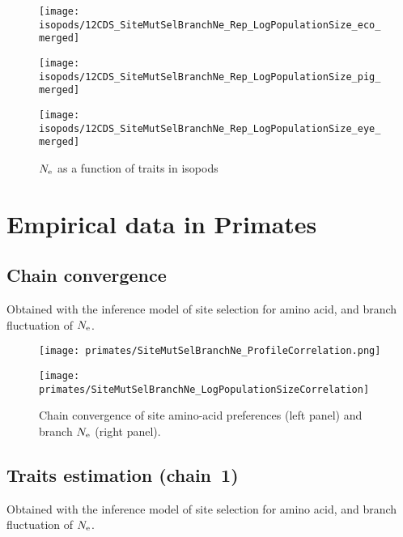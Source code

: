 \begin{figure}[H]
    \centering
    \begin{minipage}{0.32\linewidth}
        \texttt{[image: isopods/12CDS\_SiteMutSelBranchNe\_Rep\_LogPopulationSize\_eco\_merged]}
    \end{minipage} \hfill
    \begin{minipage}{0.32\linewidth}
        \texttt{[image: isopods/12CDS\_SiteMutSelBranchNe\_Rep\_LogPopulationSize\_pig\_merged]}
    \end{minipage} \hfill
    \begin{minipage}{0.32\linewidth}
        \texttt{[image: isopods/12CDS\_SiteMutSelBranchNe\_Rep\_LogPopulationSize\_eye\_merged]}
    \end{minipage}
    \caption[$\Ne$ as a function of traits in isopods]{$\Ne$ as a function of traits in isopods}
\end{figure}


\section{Empirical data in Primates}
\label{sec:empirical-data-in-primates}

\subsection{Chain convergence}
Obtained with the inference model of site selection for amino acid, and branch fluctuation of $\Ne$.

\begin{figure}[H]
    \centering
    \begin{minipage}{0.49\linewidth}
        \texttt{[image: primates/SiteMutSelBranchNe\_ProfileCorrelation.png]}
    \end{minipage} \hfill
    \begin{minipage}{0.49\linewidth}
        \texttt{[image: primates/SiteMutSelBranchNe\_LogPopulationSizeCorrelation]}
    \end{minipage}
    \caption[Chain convergence of site profiles and branche $\Ne$]{
    Chain convergence of site amino-acid preferences (left panel) and branch $\Ne$ (right panel).}
\end{figure}

\subsection{Traits estimation (chain~1)}
Obtained with the inference model of site selection for amino acid, and branch fluctuation of $\Ne$.

